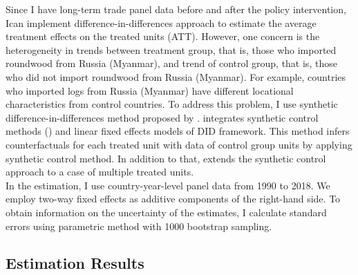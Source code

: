 \documentclass[a4paper,12pt]{article}
\begin{document}
Since I have long-term trade panel data before and after the policy intervention, Ican implement difference-in-differences approach to estimate the average treatment effects on the treated units (ATT). However, one concern is the heterogeneity in trends between treatment group, that is, those who imported roundwood from Russia (Myanmar), and trend of control group, that is, those who did not import roundwood from Russia (Myanmar). For example, countries who imported logs from Russia (Myanmar) have different locational characteristics from control countries. To address this problem, I use synthetic difference-in-differences method proposed by \cite{xu2017generalized}. \cite{xu2017generalized} integrates synthetic control methods (\cite{abadie2010synthetic}) and linear fixed effects models of DID framework. This method infers counterfactuals for each treated unit with data of control group units by applying synthetic control method. In addition to that, \cite{xu2017generalized} extends the synthetic control approach to a case of multiple treated units.\\ 

In the estimation, I use country-year-level panel data from 1990 to 2018. We employ two-way fixed effects as additive components of the right-hand side. To obtain information on the uncertainty of the estimates, I calculate standard errors using parametric method with 1000 bootstrap sampling.

\subsection{Estimation Results}
\end{document}
